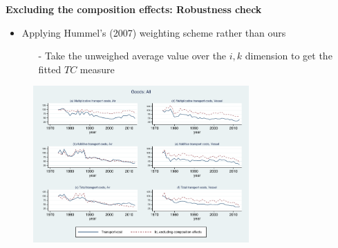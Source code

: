 \documentclass[10 pt,Helvetica, french]{beamer}
\begin{document}
\begin{frame}[label = app_compeffects_Hummels_rob]
\textbf{Excluding the composition effects: Robustness check}
\begin{itemize}
\item Applying Hummel's (2007) weighting scheme rather than ours 
\begin{itemize}
\item[-] Take the unweighed average value over the $i,k$ dimension to get the fitted $TC$ measure
\end{itemize}
\end{itemize}
\begin{figure}[htbp]
\begin{center}
\includegraphics[height=6cm]
{graph_composition_all_np.pdf}
\end{center}
\end{figure}

\hyperlink{slide_compeffects_figure}{}
\end{frame}
\end{document}

